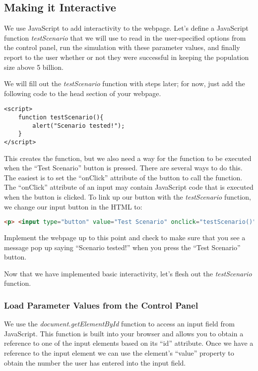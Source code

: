 \documentclass[]{memoir}
\begin{document}
\subsection{Making it Interactive}

We use JavaScript to add interactivity to the webpage. Let's define a
JavaScript function \emph{testScenario} that we will use to read in the
user-specified options from the control panel, run the simulation with
these parameter values, and finally report to the user whether or not
they were successful in keeping the population size above 5 billion.

We will fill out the \emph{testScenario} function with steps later; for
now, just add the following code to the head section of your webpage.

\begin{lstlisting}
<script>
    function testScenario(){
        alert("Scenario tested!");
    }
</script>
\end{lstlisting}

This creates the function, but we also need a way for the function to be
executed when the ``Test Scenario'' button is pressed. There are several
ways to do this. The easiest is to set the ``onClick'' attribute of the
button to call the function. The ``onClick'' attribute of an input may
contain JavaScript code that is executed when the button is clicked. To
link up our button with the \emph{testScenario} function, we change our
input button in the HTML to:

\begin{lstlisting}[language=HTML]
<p> <input type="button" value="Test Scenario" onclick="testScenario()" /> </p>
\end{lstlisting}

Implement the webpage up to this point and check to make sure that you
see a message pop up saying ``Scenario tested!'' when you press the
``Test Scenario'' button.

Now that we have implemented basic interactivity, let's flesh out the
\emph{testScenario} function.

\subsubsection{Load Parameter Values from the Control Panel}

We use the \emph{document.getElementById} function to access an input
field from JavaScript. This function is built into your browser and
allows you to obtain a reference to one of the input elements based on
its ``id'' attribute. Once we have a reference to the input element we
can use the element's ``value'' property to obtain the number the user
has entered into the input field.
\end{document}
